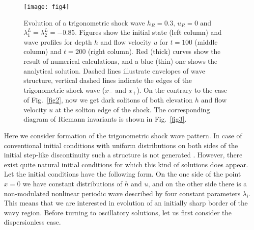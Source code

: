 \documentclass[pre,aps,superscriptaddress,twocolumn,floatfix]{revtex4-1}
\begin{document}
\begin{figure*}[t]
	\begin{center}
		\texttt{[image: fig4]}
		\caption{Evolution of a trigonometric shock wave $h_R=0.3$, $u_R=0$
and $\lambda_1^L=\lambda_2^L=-0.85$. Figures show the initial state (left column)
and wave profiles for depth $h$ and flow velocity $u$ for $t=100$ (middle column)
and $t=200$ (right column). Red (thick) curves show the result of numerical
calculations, and a blue (thin) one shows the analytical solution. Dashed lines
illustrate envelopes of wave structure, vertical dashed lines indicate the edges
of the trigonometric shock wave ($x_-$ and $x_+$). On the contrary to the
case of Fig.~\ref{fig2}, now we get dark
solitons of both elevation $h$ and  flow velocity $u$ at the soliton edge of
the shock. The corresponding diagram of
Riemann invariants is shown in Fig.~\ref{fig3}.}
		\label{fig4}
	\end{center}
\end{figure*}


Here we consider formation of the trigonometric shock wave pattern. In case of
conventional initial conditions with uniform distributions on both sides of the
initial step-like discontinuity such a structure is not generated
\cite{CongyIvanovKamchatnovPavloff-17}. However, there exist quite natural initial
conditions for which this kind of solutions does appear.
Let the initial conditions have the following form. On the one side of the point
$x = 0$ we have constant distributions of $h$ and $u$, and on the other side there is
a non-modulated nonlinear periodic wave described by four constant parameters
$\lambda_i$. This means that we are interested in evolution of an initially sharp
border of the wavy region. Before turning to oscillatory solutions, let us first
consider the dispersionless case.
\end{document}
